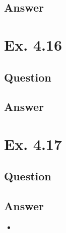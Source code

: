 \documentclass[12pt]{article}
\begin{document}
\subsection*{Answer}

\newpage
\section*{Ex. 4.16}
\subsection*{Question}

\subsection*{Answer}

\section*{Ex. 4.17}
\subsection*{Question}

\subsection*{Answer}
\begin{itemize}
	\item 
\end{itemize}
\end{document}
